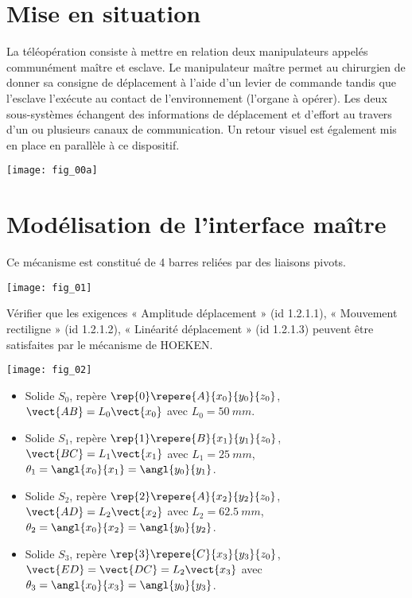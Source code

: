 \ifprof
\begin{multicols}{2}
\else
\begin{multicols}{2}
\fi

\section*{Mise en situation}
\ifprof
\else
La téléopération consiste à mettre en relation deux manipulateurs appelés communément
maître et esclave. Le manipulateur maître permet au chirurgien de donner sa consigne de
déplacement à l’aide d’un levier de commande tandis que l’esclave l’exécute au contact de
l’environnement (l’organe à opérer). Les deux sous-systèmes échangent des informations de
déplacement et d’effort au travers d’un ou plusieurs canaux de communication. Un retour
visuel est également mis en place en parallèle à ce dispositif.

\begin{center}
\texttt{[image: fig\_00a]}
\end{center}
\fi

\section*{Modélisation de l’interface maître}
\ifprof
\else

Ce mécanisme est constitué de 4 barres reliées par des liaisons pivots.

\begin{center}
\texttt{[image: fig\_01]}
\end{center}

\begin{obj}
Vérifier que les exigences « Amplitude déplacement » (id 1.2.1.1), « Mouvement
rectiligne » (id 1.2.1.2), « Linéarité déplacement » (id 1.2.1.3) peuvent être satisfaites par le mécanisme de HOEKEN.
\end{obj}


\begin{center}
\texttt{[image: fig\_02]}
\end{center}

\begin{itemize}
\item Solide $S_0$, repère $\rep{0}\repere{A}{x_0}{y_0}{z_0}$, $\vect{AB}=L_0\vect{x_0}$ avec $L_0 = \SI{50}{mm}$.
\item Solide $S_1$, repère $\rep{1}\repere{B}{x_1}{y_1}{z_0}$, $\vect{BC}=L_1\vect{x_1}$ avec $L_1 = \SI{25}{mm}$, $\theta_1=\angl{x_0}{x_1}=\angl{y_0}{y_1}$.
\item Solide $S_2$, repère $\rep{2}\repere{A}{x_2}{y_2}{z_0}$, $\vect{AD}=L_2\vect{x_2}$ avec $L_2 = \SI{62,5}{mm}$, $\theta_2=\angl{x_0}{x_2}=\angl{y_0}{y_2}$.
\item Solide $S_3$, repère $\rep{3}\repere{C}{x_3}{y_3}{z_0}$, $\vect{ED}=\vect{DC}=L_2\vect{x_3}$ avec  $\theta_3=\angl{x_0}{x_3}=\angl{y_0}{y_3}$.
\end{itemize}
\fi


\end{multicols}
\end{multicols}

